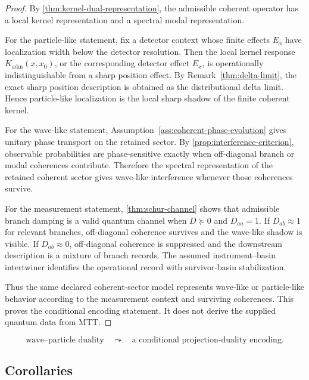 \documentclass[11pt]{article}
\newcommand{\Kadm}{K_{\mathrm{adm}}}
\begin{document}
\begin{proof}
By \cref{thm:kernel-dual-representation}, the admissible coherent operator has a local kernel
representation and a spectral modal representation.

For the particle-like statement, fix a detector context whose finite effects \(E_x\) have
localization width below the detector resolution. Then the local kernel response
\(\Kadm(x,x_0)\), or the corresponding detector effect \(E_x\), is operationally indistinguishable
from a sharp position effect. By Remark~\ref{thm:delta-limit}, the exact sharp position description is
obtained as the distributional delta limit. Hence particle-like localization is the local sharp
shadow of the finite coherent kernel.

For the wave-like statement, Assumption~\ref{ass:coherent-phase-evolution} gives unitary phase transport
on the retained sector. By \cref{prop:interference-criterion}, observable probabilities are
phase-sensitive exactly when off-diagonal branch or modal coherences contribute. Therefore
the spectral representation of the retained coherent sector gives wave-like interference
whenever those coherences survive.

For the measurement statement, \cref{thm:schur-channel} shows that admissible branch
damping is a valid quantum channel when \(D\succeq0\) and \(D_{aa}=1\). If \(D_{ab}\approx1\)
for relevant branches, off-diagonal coherence survives and the wave-like shadow is visible.
If \(D_{ab}\approx0\), off-diagonal coherence is suppressed and the downstream description
is a mixture of branch records. The assumed instrument--basin intertwiner identifies the
operational record with survivor-basin stabilization.

Thus the same declared coherent-sector model represents wave-like or particle-like behavior
according to the measurement context and surviving coherences. This proves the conditional
encoding statement. It does not derive the supplied quantum data from MTT.
\end{proof}

\begin{equation}
  \boxed{
  \text{wave--particle duality}
  \quad\leadsto\quad
  \text{a conditional projection-duality encoding}.
  }
\end{equation}

\subsection{Corollaries}
\label{subsec:projection-duality-corollaries}
\end{document}
